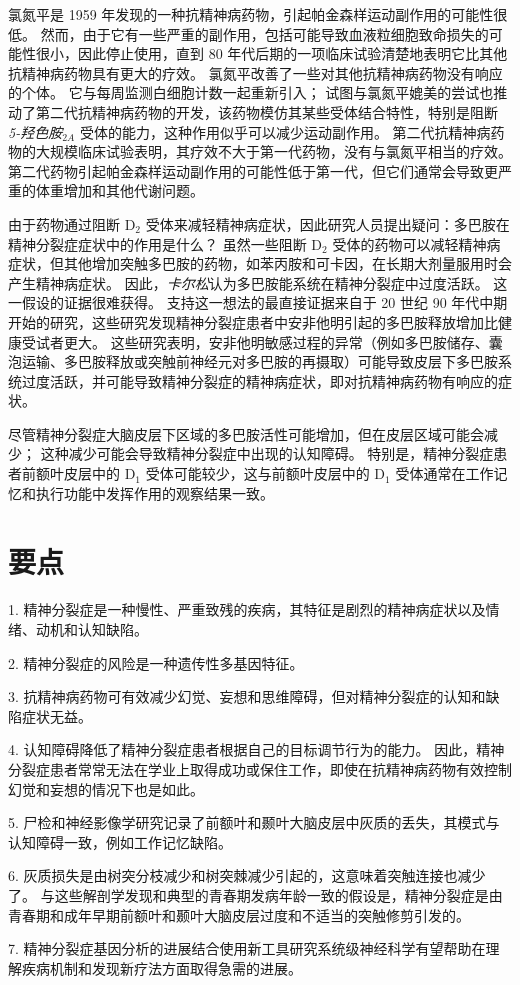 氯氮平是 1959 年发现的一种抗精神病药物，引起帕金森样运动副作用的可能性很低。
然而，由于它有一些严重的副作用，包括可能导致血液粒细胞致命损失的可能性很小，因此停止使用，直到 80 年代后期的一项临床试验清楚地表明它比其他抗精神病药物具有更大的疗效。
氯氮平改善了一些对其他抗精神病药物没有响应的个体。
它与每周监测白细胞计数一起重新引入；
试图与氯氮平媲美的尝试也推动了第二代抗精神病药物的开发，该药物模仿其某些受体结合特性，特别是阻断 \textit{5-羟色胺}$_{2A}$ 受体的能力，这种作用似乎可以减少运动副作用。
第二代抗精神病药物的大规模临床试验表明，其疗效不大于第一代药物，没有与氯氮平相当的疗效。
第二代药物引起帕金森样运动副作用的可能性低于第一代，但它们通常会导致更严重的体重增加和其他代谢问题。


由于药物通过阻断 D$_2$ 受体来减轻精神病症状，因此研究人员提出疑问：多巴胺在精神分裂症症状中的作用是什么？
虽然一些阻断 D$_2$ 受体的药物可以减轻精神病症状，但其他增加突触多巴胺的药物，如苯丙胺和可卡因，在长期大剂量服用时会产生精神病症状。
因此，\textit{卡尔松}认为多巴胺能系统在精神分裂症中过度活跃。
这一假设的证据很难获得。
支持这一想法的最直接证据来自于 20 世纪 90 年代中期开始的研究，这些研究发现精神分裂症患者中安非他明引起的多巴胺释放增加比健康受试者更大。
这些研究表明，安非他明敏感过程的异常（例如多巴胺储存、囊泡运输、多巴胺释放或突触前神经元对多巴胺的再摄取）可能导致皮层下多巴胺系统过度活跃，并可能导致精神分裂症的精神病症状，即对抗精神病药物有响应的症状。


尽管精神分裂症大脑皮层下区域的多巴胺活性可能增加，但在皮层区域可能会减少；
这种减少可能会导致精神分裂症中出现的认知障碍。
特别是，精神分裂症患者前额叶皮层中的 D$_1$ 受体可能较少，这与前额叶皮层中的 D$_1$ 受体通常在工作记忆和执行功能中发挥作用的观察结果一致。



\section{要点}

1. 精神分裂症是一种慢性、严重致残的疾病，其特征是剧烈的精神病症状以及情绪、动机和认知缺陷。


2. 精神分裂症的风险是一种遗传性多基因特征。


3. 抗精神病药物可有效减少幻觉、妄想和思维障碍，但对精神分裂症的认知和缺陷症状无益。


4. 认知障碍降低了精神分裂症患者根据自己的目标调节行为的能力。
因此，精神分裂症患者常常无法在学业上取得成功或保住工作，即使在抗精神病药物有效控制幻觉和妄想的情况下也是如此。


5. 尸检和神经影像学研究记录了前额叶和颞叶大脑皮层中灰质的丢失，其模式与认知障碍一致，例如工作记忆缺陷。


6. 灰质损失是由树突分枝减少和树突棘减少引起的，这意味着突触连接也减少了。
与这些解剖学发现和典型的青春期发病年龄一致的假设是，精神分裂症是由青春期和成年早期前额叶和颞叶大脑皮层过度和不适当的突触修剪引发的。


7. 精神分裂症基因分析的进展结合使用新工具研究系统级神经科学有望帮助在理解疾病机制和发现新疗法方面取得急需的进展。



